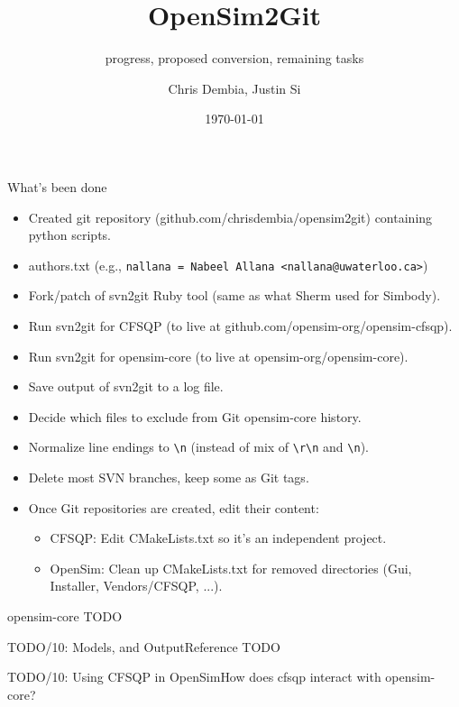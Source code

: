 \documentclass[pdf, 8pt]{beamer}
\title{OpenSim2Git}
\subtitle{progress, proposed conversion, remaining tasks}
\author{Chris Dembia, Justin Si}
\date{\today}
\def\NUMDECISIONS{10}
\begin{document}
\begin{frame}[fragile]{What's been done}

\begin{itemize}
\item Created git repository (github.com/chrisdembia/opensim2git) containing
    python scripts.
\item authors.txt (e.g., \verb|nallana = Nabeel Allana <nallana@uwaterloo.ca>|)
\item Fork/patch of svn2git Ruby tool (same as what Sherm used for Simbody).
\item Run svn2git for CFSQP (to live at github.com/opensim-org/opensim-cfsqp).
\item Run svn2git for opensim-core (to live at opensim-org/opensim-core).
\item Save output of svn2git to a log file.
\item Decide which files to exclude from Git opensim-core history.
\item Normalize line endings to \verb|\n| (instead of mix of \verb|\r\n| and
\verb|\n|).
\item Delete most SVN branches, keep some as Git tags.
\item Once Git repositories are created, edit their content:
    \begin{itemize}
    \item CFSQP: Edit CMakeLists.txt so it's an independent project.
    \item OpenSim: Clean up CMakeLists.txt for removed directories (Gui, Installer,
    Vendors/CFSQP, ...).
    \end{itemize}
\end{itemize}
\end{frame}

\begin{frame}{opensim-core}
TODO 
\end{frame}

\begin{frame}{TODO/\NUMDECISIONS: Models, and OutputReference}
TODO
\end{frame}

\begin{frame}{TODO/\NUMDECISIONS: Using CFSQP in OpenSim}{How does cfsqp interact with
opensim-core?}

\end{frame}
\end{document}
